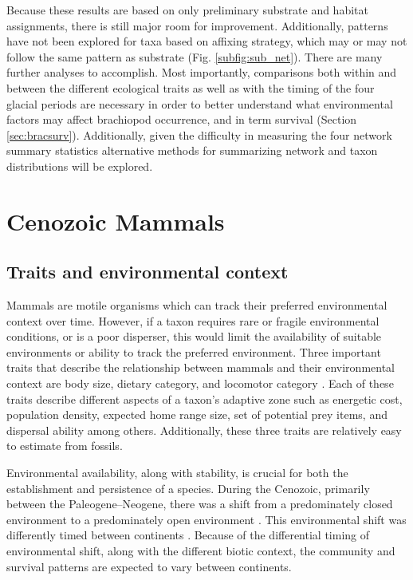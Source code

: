 \documentclass[12pt,letterpaper]{article}
\begin{document}
Because these results are based on only preliminary substrate and habitat assignments, there is still major room for improvement. Additionally, patterns have not been explored for taxa based on affixing strategy, which may or may not follow the same pattern as substrate (Fig. \ref{subfig:sub_net}). There are many further analyses to accomplish. Most importantly, comparisons both within and between the different ecological traits as well as with the timing of the four glacial periods are necessary in order to better understand what environmental factors may affect brachiopod occurrence, and in term survival (Section \ref{sec:bracsurv}). Additionally, given the difficulty in measuring the four network summary statistics alternative methods for summarizing network and taxon distributions will be explored.

\clearpage

\section{Cenozoic Mammals} \label{sec:mam}
\subsection{Traits and environmental context} \label{sec:mamback}
Mammals are motile organisms which can track their preferred environmental context over time. However, if a taxon requires rare or fragile environmental conditions, or is a poor disperser, this would limit the availability of suitable environments or ability to track the preferred environment. Three important traits that describe the relationship between mammals and their environmental context are body size, dietary category, and locomotor category \citep{Smith2004,Smith2008b,Damuth1981a,Damuth1979,Jernvall2004,Lyons2005,Lyons2010}. Each of these traits describe different aspects of a taxon's adaptive zone such as energetic cost, population density, expected home range size, set of potential prey items, and dispersal ability among others. Additionally, these three traits are relatively easy to estimate from fossils. 

Environmental availability, along with stability, is crucial for both the establishment and persistence of a species. During the Cenozoic, primarily between the Paleogene--Neogene, there was a shift from a predominately closed environment to a predominately open environment \citep{Janis1993a,Blois2009,Rose2006}. This environmental shift was differently timed between continents \citep{Stromberg2005,Stromberg2013}. Because of the differential timing of environmental shift, along with the different biotic context, the community and survival patterns are expected to vary between continents.
\end{document}
